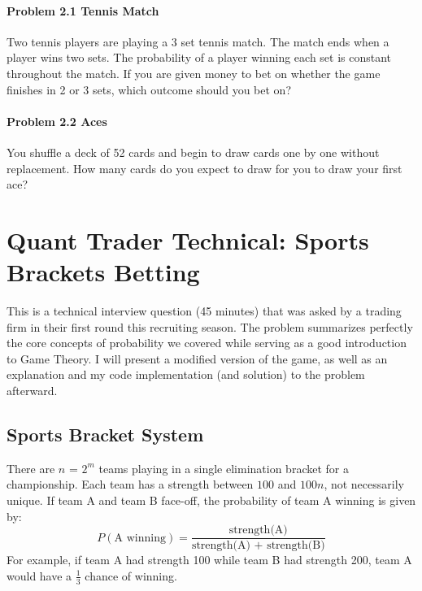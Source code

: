 \documentclass{article}
\begin{document}
\paragraph{Problem 2.1 Tennis Match}
Two tennis players are playing a 3 set tennis match. The match ends when a player wins two sets. The probability of a player winning each set is constant throughout the match. If you are given money to bet on whether the game finishes in 2 or 3 sets, which outcome should you bet on?
\newline
\newline
\paragraph{Problem 2.2 Aces}
You shuffle a deck of 52 cards and begin to draw cards one by one without replacement. How many cards do you expect to draw for you to draw your first ace?
\newline
\newline

\section{Quant Trader Technical: Sports Brackets Betting}
This is a technical interview question (45 minutes) that was asked by a trading firm in their first round this recruiting season. The problem summarizes perfectly the core concepts of probability we covered while serving as a good introduction to Game Theory. I will present a modified version of the game, as well as an explanation and my code implementation (and solution) to the problem afterward.

\subsection{Sports Bracket System}
There are \(n\) = \(2^m\) teams playing in a single elimination bracket for a championship. Each team has a strength between $100$ and \(100n\), not necessarily unique. If team A and team B face-off, the probability of team A winning is given by: 
\[P(\textrm{A winning}) = \frac{\textrm{strength(A)}}{\textrm{strength(A) + strength(B)}}\]
For example, if team A had strength 100 while team B had strength 200, team A would have a \(\frac{1}{3}\) chance of winning.
\end{document}
